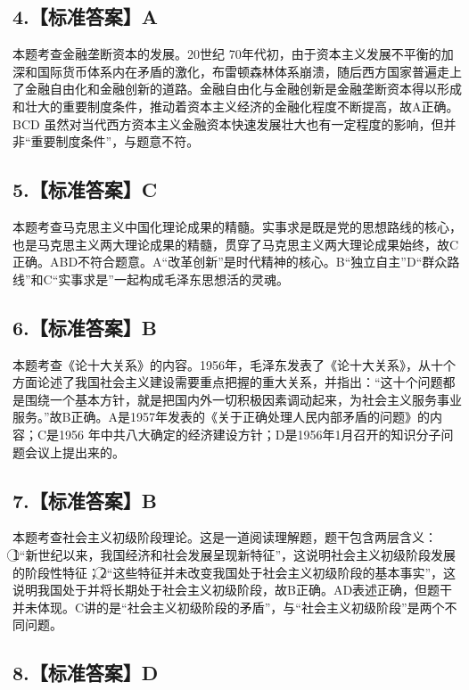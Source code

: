 \documentclass[UTF8,11pt]{ctexart}
\begin{document}
\subsection*{4.【标准答案】A}

本题考查金融垄断资本的发展。20世纪 70年代初，由于资本主义发展不平衡的加深和国际货币体系内在矛盾的激化，布雷顿森林体系崩溃，随后西方国家普遍走上了金融自由化和金融创新的道路。金融自由化与金融创新是金融垄断资本得以形成和壮大的重要制度条件，推动着资本主义经济的金融化程度不断提高，故A正确。BCD 虽然对当代西方资本主义金融资本快速发展壮大也有一定程度的影响，但并非“重要制度条件”，与题意不符。


\subsection*{5.【标准答案】C}

本题考查马克思主义中国化理论成果的精髓。实事求是既是党的思想路线的核心，也是马克思主义两大理论成果的精髓，贯穿了马克思主义两大理论成果始终，故C正确。ABD不符合题意。A“改革创新”是时代精神的核心。B“独立自主”D“群众路线”和C“实事求是”一起构成毛泽东思想活的灵魂。


\subsection*{6.【标准答案】B}

本题考查《论十大关系》的内容。1956年，毛泽东发表了《论十大关系》，从十个方面论述了我国社会主义建设需要重点把握的重大关系，并指出：“这十个问题都是围绕一个基本方针，就是把国内外一切积极因素调动起来，为社会主义服务事业服务。”故B正确。A是1957年发表的《关于正确处理人民内部矛盾的问题》的内容；C是1956 年中共八大确定的经济建设方针；D是1956年1月召开的知识分子问题会议上提出来的。


\subsection*{7.【标准答案】B}

本题考查社会主义初级阶段理论。这是一道阅读理解题，题干包含两层含义：\textcircled{1}“新世纪以来，我国经济和社会发展呈现新特征”，这说明社会主义初级阶段发展的阶段性特征；\textcircled{2}“这些特征并未改变我国处于社会主义初级阶段的基本事实”，这说明我国处于并将长期处于社会主义初级阶段，故B正确。AD表述正确，但题干并未体现。C讲的是“社会主义初级阶段的矛盾”，与“社会主义初级阶段”是两个不同问题。


\subsection*{8.【标准答案】D}
\end{document}
